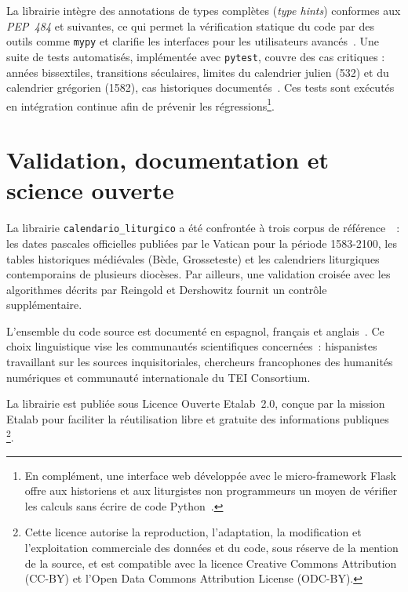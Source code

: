 \documentclass[final, fra]{anthology-ch}     %
\begin{document}
La librairie intègre des annotations de types complètes (\textit{type hints}) conformes aux \textit{PEP~484} et suivantes, ce qui permet la vérification statique du code par des outils comme \texttt{mypy} et clarifie les interfaces pour les utilisateurs avancés~\cite{echavarria2025github}. Une suite de tests automatisés, implémentée avec \texttt{pytest}, couvre des cas critiques : années bissextiles, transitions séculaires, limites du calendrier julien (532) et du calendrier grégorien (1582), cas historiques documentés~\cite{pypi}. Ces tests sont exécutés en intégration continue afin de prévenir les régressions\footnote{En complément, une interface web développée avec le micro-framework Flask offre aux historiens et aux liturgistes non programmeurs un moyen de vérifier les calculs sans écrire de code Python~\cite{echavarria2025pypi, grinberg2018flask}.}.


\section{Validation, documentation et science ouverte} \label{sec:validation}

La librairie \texttt{calendario\_liturgico} a été confrontée à trois corpus de référence~\cite{echavarria2025pypi}~: les dates pascales officielles publiées par le Vatican pour la période 1583-2100, les tables historiques médiévales (Bède, Grosseteste) et les calendriers liturgiques contemporains de plusieurs diocèses. Par ailleurs, une validation croisée avec les algorithmes décrits par Reingold et Dershowitz fournit un contrôle supplémentaire.

L'ensemble du code source est documenté en espagnol, français et anglais~\cite{echavarria2025github}. Ce choix linguistique vise les communautés scientifiques concernées~: hispanistes travaillant sur les sources inquisitoriales, chercheurs francophones des humanités numériques et communauté internationale du TEI Consortium.

La librairie est publiée sous Licence Ouverte Etalab~2.0, conçue par la mission Etalab pour faciliter la réutilisation libre et gratuite des informations publiques~\cite{etalab2017} \footnote{Cette licence autorise la reproduction, l'adaptation, la modification et l'exploitation commerciale des données et du code, sous réserve de la mention de la source, et est compatible avec la licence Creative Commons Attribution (CC-BY) et l'Open Data Commons Attribution License (ODC-BY).}.
\end{document}
